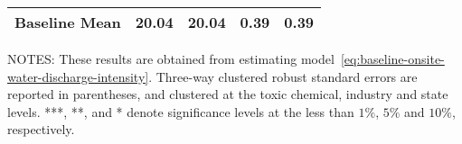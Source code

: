 \begin{table}[H]
{\begin{tabular}{@{}lllll@{}}
            Baseline Mean      & 20.04     & 20.04     & 0.39      & 0.39      \\ \bottomrule\bottomrule
        \end{tabular}%
    }
    \begin{minipage}{\columnwidth}
        \vspace{0.05in}
        NOTES: These results are obtained from estimating model~\ref{eq:baseline-onsite-water-discharge-intensity}. Three-way clustered robust standard errors are reported in parentheses, and clustered at the toxic chemical, industry and state levels. ***, **, and * denote significance levels at the less than $1\%$, $5\%$ and $10\%$, respectively.
    \end{minipage}
\end{table}